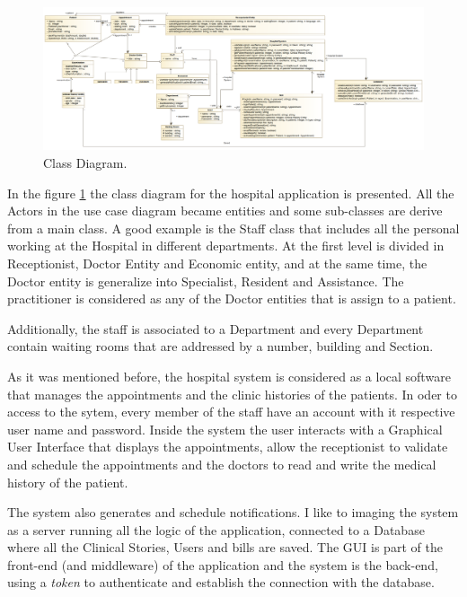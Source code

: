 \documentclass{article}
\begin{document}
            \begin{figure}[H]
                \centering 
                \includegraphics[width=1\linewidth]{./img/class.png}
                \caption{Class Diagram.}
                \label{fig:class}
            \end{figure}

            In the figure \ref{fig:class} the class diagram for the hospital application is presented. All the Actors in the use case diagram became entities and some sub-classes are derive from a main class.
            A good example is the Staff class that includes all the personal working at the Hospital in different departments. At the first level is divided in Receptionist, Doctor Entity and Economic entity, and at the same time,
            the Doctor entity is generalize into Specialist, Resident and Assistance. The practitioner is considered as any of the Doctor entities that is assign to a patient.

            Additionally, the staff is associated to a Department and every Department contain waiting rooms that are addressed by a number, building and Section.

            As it was mentioned before, the hospital system is considered as a local software that manages the appointments and the clinic histories of the patients. In oder to access to the sytem, every member of the staff have an account with
            it respective user name and password. Inside the system the user interacts with a Graphical User Interface that displays the appointments, allow the receptionist to validate and schedule the appointments and the doctors to read and write the
            medical history of the patient. 

            The system also generates and schedule notifications. I like to imaging the system as a server running all the logic of the application, connected to a Database where all the Clinical Stories, Users and bills are saved.
            The GUI is part of the front-end (and middleware) of the application and the system is the back-end, using a \textit{token} to authenticate and establish the connection with the database.
            
\end{document}
